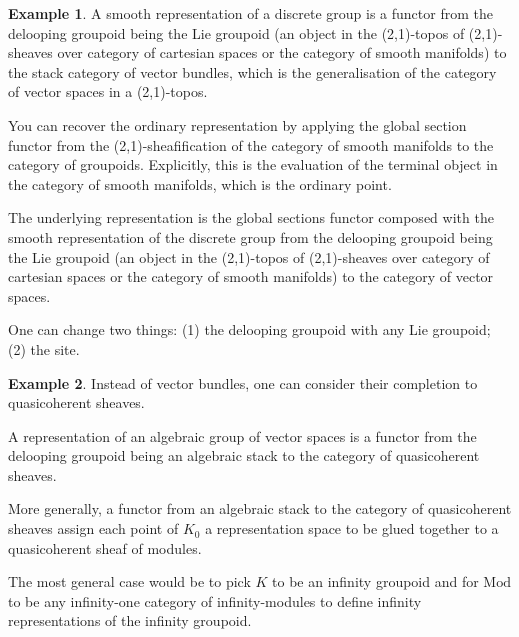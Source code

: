 \documentclass[10pt]{article}
\theoremstyle{plain}%
\theoremstyle{definition}
\newtheorem{example}{Example}[section]
\theoremstyle{remark}
\begin{document}
\begin{example}
	A smooth representation of a discrete group is a functor from the delooping groupoid being the Lie groupoid (an object in the (2,1)-topos of (2,1)-sheaves over category of cartesian spaces or the category of smooth manifolds) to the stack category of vector bundles, which is the generalisation of the category of vector spaces in a (2,1)-topos.

	You can recover the ordinary representation by applying the global section functor from the (2,1)-sheafification of the category of smooth manifolds to the category of groupoids. Explicitly, this is the evaluation of the terminal object in the category of smooth manifolds, which is the ordinary point.

	The underlying representation is the global sections functor composed with the smooth representation of the discrete group from the delooping groupoid being the Lie groupoid (an object in the (2,1)-topos of (2,1)-sheaves over category of cartesian spaces or the category of smooth manifolds) to the category of vector spaces.

	One can change two things: (1) the delooping groupoid with any Lie groupoid; (2) the site.
\end{example}

\begin{example}
	Instead of vector bundles, one can consider their completion to quasicoherent sheaves.

	A representation of an algebraic group of vector spaces is a functor from the delooping groupoid being an algebraic stack to the category of quasicoherent sheaves.

	More generally, a functor from an algebraic stack to the category of quasicoherent sheaves assign each point of $K_0$ a representation space to be glued together to a quasicoherent sheaf of modules.

	The most general case would be to pick $K$ to be an infinity groupoid and for $\mathrm{Mod}$ to be any infinity-one category of infinity-modules to define infinity representations of the infinity groupoid.
\end{example}
\end{document}
